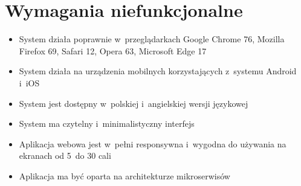 \section{Wymagania niefunkcjonalne}\label{sec:nonfunctional-requirements}
\begin{itemize}
    \item System działa poprawnie w~przeglądarkach Google Chrome 76, Mozilla Firefox 69, Safari 12, Opera 63, Microsoft Edge 17
    \item System działa na urządzenia mobilnych korzystających z~systemu Android i~iOS
    \item System jest dostępny w~polskiej i~angielskiej wersji językowej
    \item System ma czytelny i~minimalistyczny interfejs
    \item Aplikacja webowa jest w~pełni responsywna i~wygodna do używania na ekranach od 5~do 30 cali
    \item Aplikacja ma być oparta na architekturze mikroserwisów
\end{itemize}
\thispagestyle{normal}

